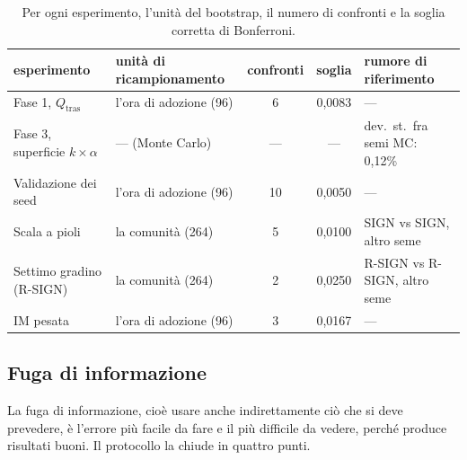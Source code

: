 \documentclass[11pt,a4paper]{article}
\newcommand{\Qtras}{Q_{\mathrm{tras}}}
\begin{document}
\begin{table}[htbp]
  \centering\small
  \caption{Per ogni esperimento, l'unità del bootstrap, il numero di confronti e la soglia corretta di Bonferroni.}
  \label{tab:protocollo}
  \footnotesize\setlength{\tabcolsep}{4pt}
  \begin{tabular}{llccl}
    \toprule
    esperimento & unità di ricampionamento & confronti & soglia & rumore di riferimento \\
    \midrule
    Fase 1, $\Qtras$ & l'ora di adozione (96) & 6 & 0,0083 & — \\
    Fase 3, superficie $k\times\alpha$ & — (Monte Carlo) & — & — & dev.\ st.\ fra semi MC: 0,12\% \\
    Validazione dei seed & l'ora di adozione (96) & 10 & 0,0050 & — \\
    Scala a pioli & la comunità (264) & 5 & 0,0100 & SIGN vs SIGN, altro seme \\
    Settimo gradino (R-SIGN) & la comunità (264) & 2 & 0,0250 & R-SIGN vs R-SIGN, altro seme \\
    IM pesata & l'ora di adozione (96) & 3 & 0,0167 & — \\
    \bottomrule
  \end{tabular}
\end{table}

\subsection{Fuga di informazione}
La fuga di informazione, cioè usare anche indirettamente ciò che si deve prevedere, è l'errore più facile da fare e il più difficile da vedere, perché produce risultati buoni. Il protocollo la chiude in quattro punti.
\end{document}
